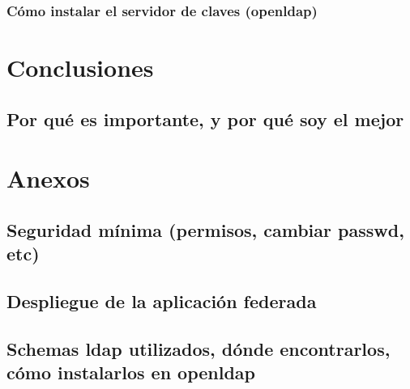         \subsection{Cómo instalar el servidor de claves (openldap)}


\chapter{Conclusiones}
    \section{Por qué es importante, y por qué soy el mejor}



\chapter{Anexos}
    \section{Seguridad mínima (permisos, cambiar passwd, etc)}
    \section{Despliegue de la aplicación federada}
    \section{Schemas ldap utilizados, dónde encontrarlos, cómo instalarlos
    en openldap}

\newpage



